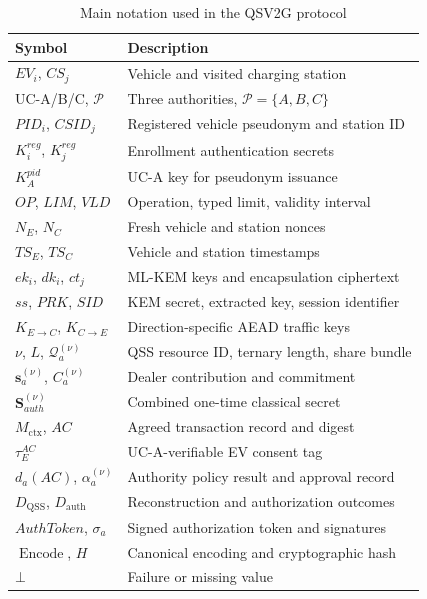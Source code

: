 \documentclass[twocolumn,10pt,journal]{IEEEtran}
\begin{document}
\begin{table}[!t]
\caption{Main notation used in the QSV2G protocol}
\label{tab:qsv2g_notation}
\centering
\scriptsize
\renewcommand{\arraystretch}{1.07}
\begin{tabular}{@{}>{\raggedright\arraybackslash}p{}>{\raggedright\arraybackslash}p{}@{}}
\hline
Symbol & Description\\
\hline
$EV_i$, $CS_j$ & Vehicle and visited charging station\\
UC-A/B/C, $\mathcal P$ & Three authorities, $\mathcal P=\{A,B,C\}$\\
$PID_i$, $CSID_j$ & Registered vehicle pseudonym and station ID\\
$K_i^{reg}$, $K_j^{reg}$ & Enrollment authentication secrets\\
$K_A^{pid}$ & UC-A key for pseudonym issuance\\
$OP$, $LIM$, $VLD$ & Operation, typed limit, validity interval\\
$N_E$, $N_C$ & Fresh vehicle and station nonces\\
$TS_E$, $TS_C$ & Vehicle and station timestamps\\
$ek_i$, $dk_i$, $ct_j$ & ML-KEM keys and encapsulation ciphertext\\
$ss$, $PRK$, $SID$ & KEM secret, extracted key, session identifier\\
$K_{E\to C}$, $K_{C\to E}$ & Direction-specific AEAD traffic keys\\
$\nu$, $L$, $\mathcal Q_a^{(\nu)}$ & QSS resource ID, ternary length, share bundle\\
$\mathbf s_a^{(\nu)}$, $C_a^{(\nu)}$ & Dealer contribution and commitment\\
$\mathbf S_{auth}^{(\nu)}$ & Combined one-time classical secret\\
$M_{\mathrm{ctx}}$, $AC$ & Agreed transaction record and digest\\
$\tau_E^{AC}$ & UC-A-verifiable EV consent tag\\
$d_a(AC)$, $\alpha_a^{(\nu)}$ & Authority policy result and approval record\\
$D_{\mathrm{QSS}}$, $D_{\mathrm{auth}}$ & Reconstruction and authorization outcomes\\
$AuthToken$, $\sigma_a$ & Signed authorization token and signatures\\
$\operatorname{Encode}$, $H$ & Canonical encoding and cryptographic hash\\
$\bot$ & Failure or missing value\\
\hline
\end{tabular}
\end{table}
\end{document}
